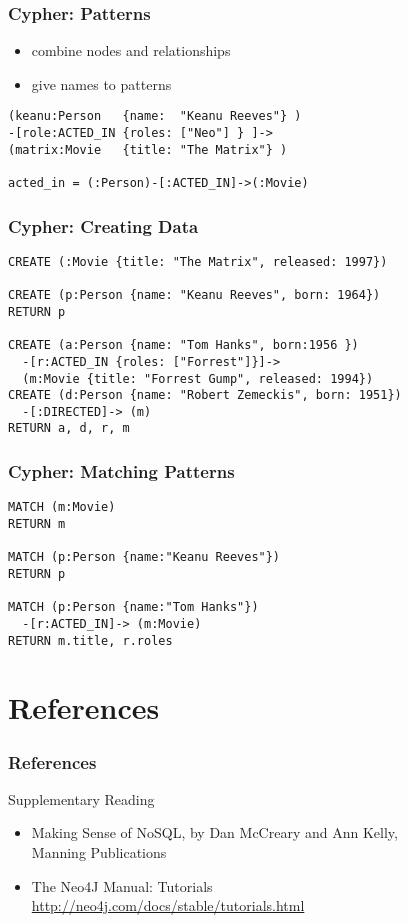 \documentclass[dvipsnames]{beamer}
\theoremstyle{plain}
\begin{document}
\begin{frame}[fragile]
  \frametitle{Cypher: Patterns}

  \begin{itemize}
    \item combine nodes and relationships
    \item give names to patterns
  \end{itemize}

  \begin{lstlisting}
(keanu:Person   {name:  "Keanu Reeves"} )
-[role:ACTED_IN {roles: ["Neo"] } ]->
(matrix:Movie   {title: "The Matrix"} )

acted_in = (:Person)-[:ACTED_IN]->(:Movie)
  \end{lstlisting}
\end{frame}

\begin{frame}[fragile]
  \frametitle{Cypher: Creating Data}

  \begin{lstlisting}
CREATE (:Movie {title: "The Matrix", released: 1997})

CREATE (p:Person {name: "Keanu Reeves", born: 1964})
RETURN p

CREATE (a:Person {name: "Tom Hanks", born:1956 })
  -[r:ACTED_IN {roles: ["Forrest"]}]->
  (m:Movie {title: "Forrest Gump", released: 1994})
CREATE (d:Person {name: "Robert Zemeckis", born: 1951})
  -[:DIRECTED]-> (m)
RETURN a, d, r, m
  \end{lstlisting}
\end{frame}

\begin{frame}[fragile]
  \frametitle{Cypher: Matching Patterns}

  \begin{lstlisting}
MATCH (m:Movie)
RETURN m

MATCH (p:Person {name:"Keanu Reeves"})
RETURN p

MATCH (p:Person {name:"Tom Hanks"})
  -[r:ACTED_IN]-> (m:Movie)
RETURN m.title, r.roles
  \end{lstlisting}
\end{frame}

\section*{References}

\begin{frame}
  \frametitle{References}

  \begin{block}{Supplementary Reading}
    \begin{itemize}
      \item Making Sense of NoSQL, by Dan McCreary and Ann Kelly,\\
        Manning Publications
      \item The Neo4J Manual: Tutorials\\
        \url{http://neo4j.com/docs/stable/tutorials.html}
    \end{itemize}
  \end{block}
\end{frame}
\end{document}
